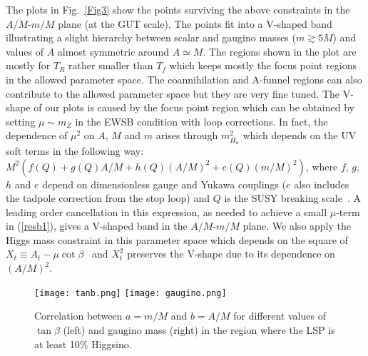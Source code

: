 \documentclass[11pt,a4paper]{article}
\begin{document}
The plots in Fig.~\ref{Fig3} show the points surviving the above constraints in the $A/M$-$m/M$ plane (at the GUT scale). The points fit into a V-shaped band illustrating a slight hierarchy between scalar and gaugino masses ($m\gtrsim 5 M$) and values of $A$ almost symmetric around $A\simeq M$. The regions shown in the plot are mostly for $T_R$ rather smaller than $T_f$ which keeps mostly the focus point regions in the allowed parameter space. The coannihilation and A-funnel regions can also contribute to the allowed parameter space but they are very fine tuned. The V-shape of our plots is caused by the focus point region which can be obtained by setting $\mu\sim m_Z$ in the EWSB condition with loop corrections. In fact, the dependence of $\mu^2$ on $A$, $M$ and $m$ arises through $m_{H_u}^2$ which depends on the UV soft terms in the following way: $M^2(f(Q) + g(Q) A/M+ h(Q) (A/M)^2 + e(Q) (m/M)^2)$, where $f$, $g$, $h$ and $e$ depend on dimensionless gauge and Yukawa couplings ($e$ also includes the tadpole correction from the stop loop)
 and $Q$ is the SUSY breaking scale~\cite{FMM}. A leading order cancellation in this expression, 
as needed to achieve a small $\mu$-term in (\ref{resb1}), gives a V-shaped band in the $A/M$-$m/M$ plane. We also apply the Higgs mass constraint in this parameter space which depends on the square of $X_t\equiv A_t-\mu \cot\beta$~\cite{Carena:1995bx} and $X_t^2$ preserves the V-shape due to its dependence on $(A/M)^2$.

\begin{figure}[!ht]
\centering
\texttt{[image: tanb.png]}
\texttt{[image: gaugino.png]}
\caption{Correlation between $a=m/M$ and $b=A/M$ for different values of $\tan\beta$ (left) and gaugino mass (right)
in the region where the LSP is at least 10\% Higgsino.}
\label{Fig4}
\end{figure}
\end{document}
